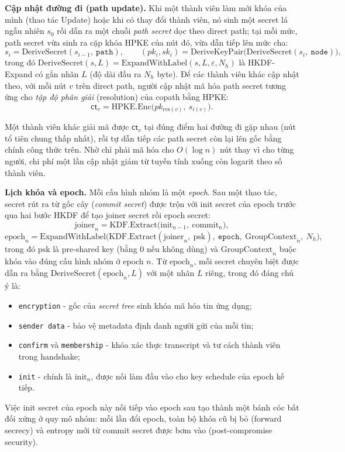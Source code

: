 \textbf{Cập nhật đường đi (path update).} Khi một thành viên làm mới khóa của mình (thao tác Update) hoặc khi có thay đổi thành viên, nó sinh một secret lá ngẫu nhiên $s_0$ rồi dẫn ra một chuỗi \emph{path secret} dọc theo direct path; tại mỗi mức, path secret vừa sinh ra cặp khóa HPKE của nút đó, vừa dẫn tiếp lên mức cha:
\[
  s_{i} = \mathrm{DeriveSecret}(s_{i-1},\ \mathtt{path}), \qquad
  (pk_i, sk_i) = \mathrm{DeriveKeyPair}\bigl(\mathrm{DeriveSecret}(s_i,\ \mathtt{node})\bigr),
\]
trong đó $\mathrm{DeriveSecret}(s, L) = \mathrm{ExpandWithLabel}(s, L, \varepsilon, N_h)$ là HKDF-Expand có gắn nhãn $L$ (độ dài đầu ra $N_h$ byte). Để các thành viên khác cập nhật theo, với mỗi nút $v$ trên direct path, người cập nhật mã hóa path secret tương ứng cho \emph{tập độ phân giải} (resolution) của copath bằng HPKE:
\[
  \mathsf{ct}_v = \mathrm{HPKE.Enc}\bigl(pk_{\mathrm{res}(v)},\ s_{i(v)}\bigr).
\]

Một thành viên khác giải mã được $\mathsf{ct}_v$ tại đúng điểm hai đường đi gặp nhau (nút tổ tiên chung thấp nhất), rồi tự dẫn tiếp các path secret còn lại lên gốc bằng chính công thức trên. Nhờ chỉ phải mã hóa cho $O(\log n)$ nút thay vì cho từng người, chi phí một lần cập nhật giảm từ tuyến tính xuống còn logarit theo số thành viên.

\textbf{Lịch khóa và epoch.} Mỗi cấu hình nhóm là một \emph{epoch}. Sau một thao tác, secret rút ra từ gốc cây (\emph{commit secret}) được trộn với init secret của epoch trước qua hai bước HKDF để tạo joiner secret rồi epoch secret:
\[
  \text{joiner}_n = \mathrm{KDF.Extract}\bigl(\text{init}_{n-1},\ \text{commit}_n\bigr),
\]
\[
  \text{epoch}_n = \mathrm{ExpandWithLabel}\bigl(\mathrm{KDF.Extract}(\text{joiner}_n,\ \text{psk}),\ \mathtt{epoch},\ \mathrm{GroupContext}_n,\ N_h\bigr),
\]
trong đó $\text{psk}$ là pre-shared key (bằng 0 nếu không dùng) và $\mathrm{GroupContext}_n$ buộc khóa vào đúng cấu hình nhóm ở epoch $n$. Từ $\text{epoch}_n$, mỗi secret chuyên biệt được dẫn ra bằng $\mathrm{DeriveSecret}(\text{epoch}_n, L)$ với một nhãn $L$ riêng, trong đó đáng chú ý là:
\begin{itemize}
  \item \texttt{encryption} - gốc của \emph{secret tree} sinh khóa mã hóa tin ứng dụng;
  \item \texttt{sender data} - bảo vệ metadata định danh người gửi của mỗi tin;
  \item \texttt{confirm} và \texttt{membership} - khóa xác thực transcript và tư cách thành viên trong handshake;
  \item \texttt{init} - chính là $\text{init}_n$, được nối làm đầu vào cho key schedule của epoch kế tiếp.
\end{itemize}
Việc init secret của epoch này nối tiếp vào epoch sau tạo thành một bánh cóc bất đối xứng ở quy mô nhóm: mỗi lần đổi epoch, toàn bộ khóa cũ bị bỏ (forward secrecy) và entropy mới từ commit secret được bơm vào (post-compromise security).

